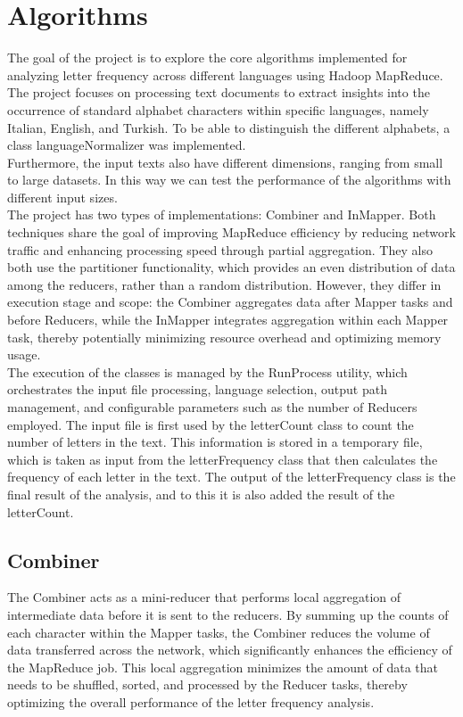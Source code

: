\chapter{Algorithms}


The goal of the project is to explore the core algorithms implemented for analyzing letter frequency across different languages using Hadoop MapReduce. 
The project focuses on processing text documents to extract insights into the occurrence of standard alphabet characters within specific languages, namely Italian, English, and Turkish. 
To be able to distinguish the different alphabets, a class languageNormalizer was implemented. \\
Furthermore, the input texts also have different dimensions, ranging from small to large datasets.
In this way we can test the performance of the algorithms with different input sizes. \\
The project has two types of implementations: Combiner and InMapper. Both techniques share the goal of improving MapReduce efficiency by reducing network traffic and enhancing processing speed through partial aggregation. They also both use the partitioner functionality, which provides an even distribution of data among the reducers, rather than a random distribution. However, they differ in execution stage and scope: the Combiner aggregates data after Mapper tasks and before Reducers, while the InMapper integrates aggregation within each Mapper task, thereby potentially minimizing resource overhead and optimizing memory usage. \\
The execution of the classes is managed by the RunProcess utility, which orchestrates the input file processing, language selection, output path management, and configurable parameters such as the number of Reducers employed. The input file is first used by the letterCount class to count the number of letters in the text. This information is stored in a temporary file, which is taken as input from the letterFrequency class that then calculates the frequency of each letter in the text. The output of the letterFrequency class is the final result of the analysis, and to this it is also added the result of the letterCount.

\section{Combiner}

The Combiner acts as a mini-reducer that performs local aggregation of intermediate data before it is sent to the reducers. By summing up the counts of each character within the Mapper tasks, the Combiner reduces the volume of data transferred across the network, which significantly enhances the efficiency of the MapReduce job. This local aggregation minimizes the amount of data that needs to be shuffled, sorted, and processed by the Reducer tasks, thereby optimizing the overall performance of the letter frequency analysis.



